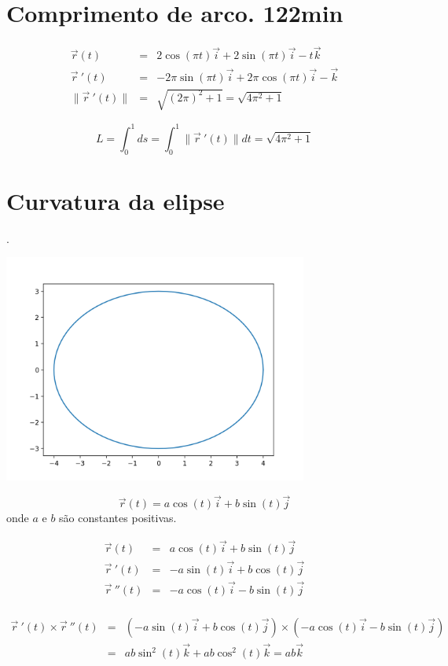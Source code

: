 \documentclass[a4paper,10pt]{article}
\begin{document}
 \section{Comprimento de arco. 122min}
 
 \begin{eqnarray*}
 \vec{r}(t)&=&2\cos(\pi t)\vec{i}+2\sin(\pi t)\vec{i}-t\vec{k}\\
  \vec{r}\!~'(t)&=&-2\pi\sin(\pi t)\vec{i}+2\pi\cos(\pi t)\vec{i}-\vec{k}\\
  \|\vec{r}\!~'(t)\|&=&\sqrt{(2\pi)^2+1}=\sqrt{4\pi^2+1}
 \end{eqnarray*}
 
 $$L=\int_0^1ds = \int_0^1\|\vec{r}\!~'(t)\|dt=\sqrt{4\pi^2+1}$$
 
 \section{Curvatura da elipse}.
 
 \begin{center}
 \includegraphics[width=10cm]{figs/elipse.png}
 \end{center}
 
 $$\vec{r}(t)=a\cos(t)\vec{i}+b\sin(t)\vec{j}$$
 onde $a$ e $b$ são constantes positivas. 
 
 \begin{eqnarray*}
  \vec{r}(t)&=&a\cos(t)\vec{i}+b\sin(t)\vec{j}\\
  \vec{r}\!~'(t)&=&-a\sin(t)\vec{i}+b\cos(t)\vec{j}\\
  \vec{r}\!~''(t)&=&-a\cos(t)\vec{i}-b\sin(t)\vec{j}\\
 \end{eqnarray*}

 \begin{eqnarray*}
  \vec{r}\!~'(t)\times \vec{r}\!~''(t)&=&\left(-a\sin(t)\vec{i}+b\cos(t)\vec{j}\right)\times \left(-a\cos(t)\vec{i}-b\sin(t)\vec{j}\right)\\
  &=&ab\sin^2(t)\vec{k}+ab\cos^2(t)\vec{k}= ab\vec{k}
   \end{eqnarray*}
\end{document}
